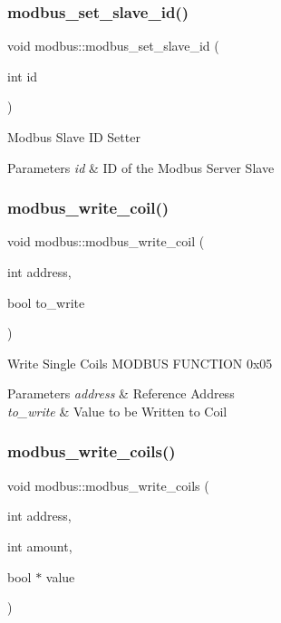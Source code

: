 \subsubsection{\texorpdfstring{modbus\+\_\+set\+\_\+slave\+\_\+id()}{modbus\_set\_slave\_id()}}
{\footnotesize\ttfamily void modbus\+::modbus\+\_\+set\+\_\+slave\+\_\+id (\begin{DoxyParamCaption}\item[{int}]{id }\end{DoxyParamCaption})}

Modbus Slave ID Setter 
\begin{DoxyParams}{Parameters}
{\em id} & ID of the Modbus Server Slave \\
\hline
\end{DoxyParams}
\mbox{\label{classmodbus_a8717e5472d5a536beb0308bdeeac2233}} 
\subsubsection{\texorpdfstring{modbus\+\_\+write\+\_\+coil()}{modbus\_write\_coil()}}
{\footnotesize\ttfamily void modbus\+::modbus\+\_\+write\+\_\+coil (\begin{DoxyParamCaption}\item[{int}]{address,  }\item[{bool}]{to\+\_\+write }\end{DoxyParamCaption})}

Write Single Coils M\+O\+D\+B\+US F\+U\+N\+C\+T\+I\+ON 0x05 
\begin{DoxyParams}{Parameters}
{\em address} & Reference Address \\
\hline
{\em to\+\_\+write} & Value to be Written to Coil \\
\hline
\end{DoxyParams}
\mbox{\label{classmodbus_a26201b5f872bce56f665d905ffcaaa97}} 
\subsubsection{\texorpdfstring{modbus\+\_\+write\+\_\+coils()}{modbus\_write\_coils()}}
{\footnotesize\ttfamily void modbus\+::modbus\+\_\+write\+\_\+coils (\begin{DoxyParamCaption}\item[{int}]{address,  }\item[{int}]{amount,  }\item[{bool $\ast$}]{value }\end{DoxyParamCaption})}

